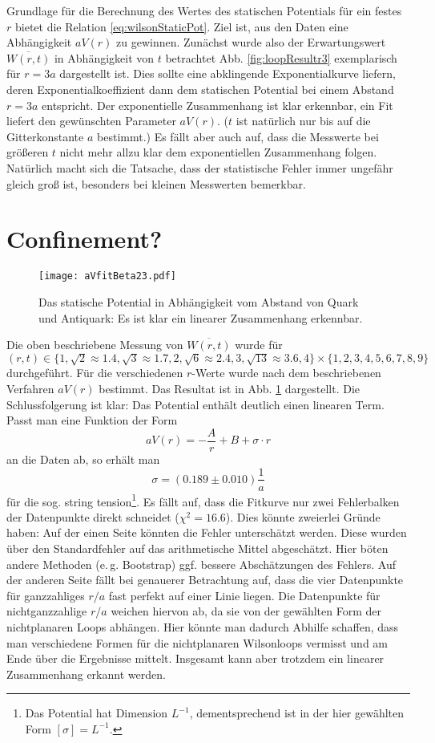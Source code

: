 Grundlage für die Berechnung des Wertes des statischen Potentials für ein festes
$r$ bietet die Relation \eqref{eq:wilsonStaticPot}. Ziel ist, aus den Daten eine
Abhängigkeit $aV(r)$ zu gewinnen. Zunächst wurde also der
Erwartungswert $\overline{W(r,t)}$ in Abhängigkeit von $t$ betrachtet
Abb. \ref{fig:loopResultr3} exemplarisch für $r = 3a$ dargestellt ist. Dies sollte
eine abklingende Exponentialkurve liefern, deren Exponentialkoeffizient dann dem
statischen Potential bei einem Abstand $r=3a$ entspricht. Der exponentielle
Zusammenhang ist klar erkennbar, ein Fit liefert den gewünschten Parameter
$a V(r)$. ($t$ ist natürlich nur bis auf die Gitterkonstante $a$ bestimmt.) Es
fällt aber auch auf, dass die Messwerte bei größeren $t$ nicht mehr allzu klar
dem exponentiellen Zusammenhang folgen. Natürlich macht sich die Tatsache, dass
der statistische Fehler immer ungefähr gleich groß ist, besonders bei kleinen
Messwerten bemerkbar.

\section{Confinement?}

\begin{figure}[htbp]
    \centering
    \texttt{[image: aVfitBeta23.pdf]}
    \caption{Das statische Potential in Abhängigkeit vom Abstand von Quark und
    Antiquark: Es ist klar ein linearer Zusammenhang erkennbar.}
    \label{fig:aVfit}
\end{figure}

Die oben beschriebene Messung von $\overline{W(r,t)}$ wurde für
$(r, t) \in \{1, \sqrt{2} \approx 1.4, \sqrt{3} \approx 1.7, 2, \sqrt{6} \approx 2.4,  3, \sqrt{13} \approx 3.6, 4\} \times \{1,2,3,4,5,6,7,8,9\}$
durchgeführt. Für die verschiedenen $r$-Werte wurde nach dem beschriebenen
Verfahren $a V(r)$ bestimmt. Das Resultat ist in Abb. \ref{fig:aVfit} dargestellt.
Die Schlussfolgerung ist klar: Das Potential enthält deutlich einen linearen Term.
Passt man eine Funktion der Form
\[
    a V(r) = -\frac{A}{r} + B + \sigma \cdot r
\]
an die Daten ab, so erhält man
\[
    \sigma = (0.189\pm 0.010) \frac{1}{a}
\]
für die sog. string tension\footnote{Das Potential hat Dimension $L^{-1}$,
dementsprechend ist in der hier gewählten Form $[\sigma] = L^{-1}$.}. Es fällt auf,
dass die Fitkurve nur zwei Fehlerbalken der Datenpunkte direkt schneidet
($\chi^2 = 16.6$). Dies
könnte zweierlei Gründe haben: Auf der einen Seite könnten die Fehler unterschätzt
werden. Diese wurden über den Standardfehler auf das arithmetische Mittel abgeschätzt.
Hier böten andere Methoden (e.\,g. Bootstrap) ggf. bessere Abschätzungen des Fehlers.
Auf der anderen Seite fällt bei genauerer Betrachtung auf, dass die vier Datenpunkte
für ganzzahliges $r/a$ fast perfekt auf einer Linie liegen. Die Datenpunkte für
nichtganzzahlige $r/a$ weichen hiervon ab, da sie von der gewählten Form der
nichtplanaren Loops abhängen. Hier könnte man dadurch Abhilfe schaffen, dass man
verschiedene Formen für die nichtplanaren Wilsonloops vermisst und am Ende über 
die Ergebnisse mittelt. Insgesamt kann aber trotzdem ein linearer Zusammenhang
erkannt werden.

